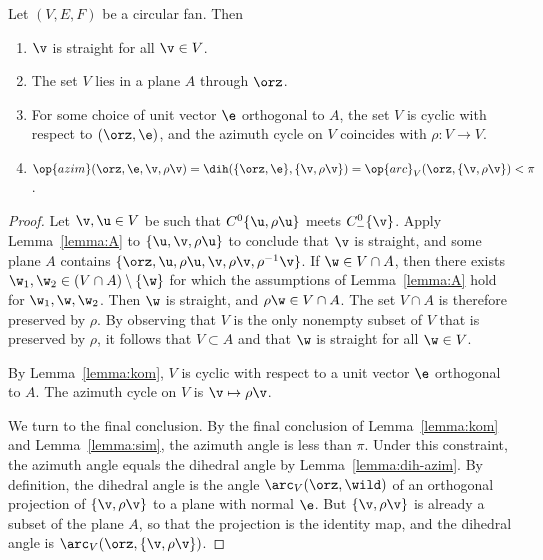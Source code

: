 \begin{lemma}
\label{lemma:circular}
Let $(V,E,F)$ be a circular fan. Then
\begin{enumerate}\wasitemize 
\item $\v$ is straight for all $\v\in V$.
\item The set $V$ lies in a plane $A$ through $\orz$.
\item For some choice of unit vector $\e$ orthogonal to $A$, the set
$V$ is cyclic with respect to $(\orz,\e)$, and the azimuth cycle on
$V$ coincides with $\rho:V\to V$.  
\item 
$
\op{azim}(\orz,\e,\v,\rho\v) = \dih(\{\orz,\e\},\{\v,\rho\v\})
=\op{arc}_V(\orz,\{\v,\rho \v\}) <\pi
$.
\end{enumerate}\wasitemize 
\end{lemma}

\begin{proof} Let $\v, \u\in V$ be such that $C^0\{\u,\rho \u\}$ meets
$C^0_-\{\v\}$.  Apply Lemma~\ref{lemma:A} to $\{\u,\v,\rho \u\}$ to
conclude that $\v$ is straight, and some plane $A$ contains
$\{\orz,\u,\rho\u,\v,\rho \v,\rho^{-1} \v\}$.  If
$\w\in V\cap A$, then there exists $\w_1,\w_2\in (V\cap
A)\setminus\{\w\}$ for which the assumptions of Lemma~\ref{lemma:A}
hold for $\w_1,\w,\w_2$.  
Then $\w$ is straight, and $\rho \w \in V\cap A$.  The set $V\cap
A$ is therefore preserved by $\rho$.  By observing that $V$ is the
only nonempty subset of $V$ that is preserved by $\rho$, it follows
that $V\subset A$ and that $\w$ is straight for all $\w\in V$.


By Lemma~\ref{lemma:kom}, $V$ is cyclic with respect to a unit
vector $\e$ orthogonal to $A$.  The azimuth cycle on $V$ is $\v
\mapsto \rho \v$.

We turn to the final conclusion.  By the final conclusion of
Lemma~\ref{lemma:kom} and Lemma~\ref{lemma:sim}, the azimuth angle is
less than $\pi$.  Under this constraint, the azimuth angle equals the
dihedral angle by Lemma~\ref{lemma:dih-azim}.  By definition, the
dihedral angle is the angle $\arc_V(\orz,\wild )$ of an orthogonal
projection of $\{\v,\rho\v\}$ to a plane with normal $\e$.  But
$\{\v,\rho\v\}$ is already a subset of the plane $A$, so that the
projection is the identity map, and the dihedral angle is
$\arc_V(\orz,\{\v,\rho\v\})$.
%
\end{proof}

